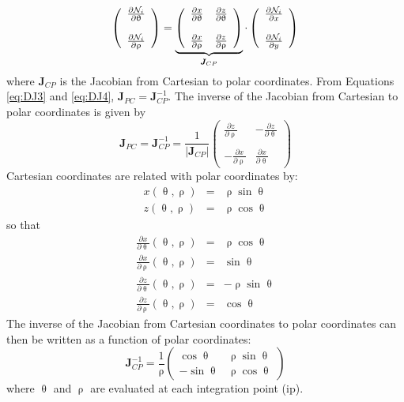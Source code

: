 \begin{equation}
\left(
\begin{array}{c}
\frac{\partial {\mathcal{N}}_i}{\partial \uptheta} \\ \\
\frac{\partial {\mathcal{N}}_i}{\partial \uprho} 
\end{array}
\right)
= 
\underbrace{\left(
\begin{array}{cc}
\frac{\partial x}{\partial \uptheta}  & 
\frac{\partial z}{\partial \uptheta}  \\ \\
\frac{\partial x}{\partial \uprho}   &
\frac{\partial z}{\partial \uprho}
\end{array}
\right)}_{{\bm J}_{CP}}
\cdot
\left(
\begin{array}{c}
\frac{\partial {\mathcal{N}}_i}{\partial x} \\ \\
\frac{\partial {\mathcal{N}}_i}{\partial y} 
\end{array}
\right)
\label{eq:DJ4}
\end{equation}
where ${\bm J}_{CP}$ is the Jacobian from Cartesian to polar coordinates. 
From Equations \eqref{eq:DJ3} and \eqref{eq:DJ4}, ${\bm J}_{PC}={\bm J}_{CP}^{-1} $. The inverse
of the Jacobian from Cartesian to polar coordinates is given by
\[
{\bm J}_{PC}= {\bm J}_{CP}^{-1}=
\frac{1}{|{\bm J}_{CP}|}
\left(
\begin{array}{cc}
\frac{\partial z}{\partial \uprho} & 
-\frac{\partial z}{\partial \uptheta}  \\ \\
-\frac{\partial x}{\partial \uprho}   &
\frac{\partial x}{\partial \uptheta}
\end{array}
\right)
\]
Cartesian coordinates are related with polar coordinates by:
\begin{eqnarray}
x(\uptheta,\uprho) &=& \uprho \sin \uptheta \\
z(\uptheta,\uprho) &=& \uprho \cos \uptheta 
\end{eqnarray}
so that 
\begin{eqnarray}
\frac{\partial x}{\partial \uptheta} (\uptheta,\uprho) &=& \uprho \cos \uptheta \\
\frac{\partial x}{\partial \uprho} (\uptheta,\uprho) &=&  \sin \uptheta \\
\frac{\partial z}{\partial \uptheta} (\uptheta,\uprho) &=& -\uprho \sin \uptheta \\
\frac{\partial z}{\partial \uprho} (\uptheta,\uprho) &=& \cos \uptheta 
\end{eqnarray}
The inverse of the Jacobian from Cartesian coordinates to polar coordinates can then be written 
as a function of polar coordinates:
\begin{equation}
\boxed{
{\bm J}_{CP}^{-1} 
= 
\frac{1}{\uprho}
\left(
\begin{array}{cc}
\cos \uptheta & \uprho\sin\uptheta \\
-\sin\uptheta & \uprho\cos\uptheta
\end{array}
\right)}
\label{eq:DJ6}
\end{equation}
where $\uptheta$ and $\uprho$ are evaluated at each integration point (ip).

